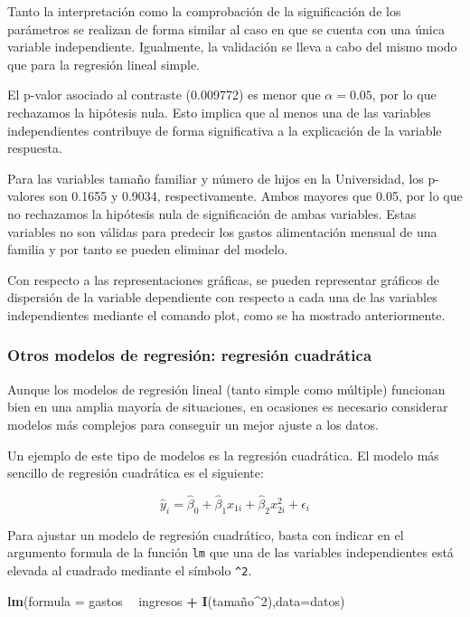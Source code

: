 \documentclass[]{book}
\newenvironment{Shaded}{\begin{snugshade}}{\end{snugshade}}
\newcommand{\KeywordTok}[1]{\textcolor[rgb]{0.13,0.29,0.53}{\textbf{#1}}}
\newcommand{\DataTypeTok}[1]{\textcolor[rgb]{0.13,0.29,0.53}{#1}}
\newcommand{\DecValTok}[1]{\textcolor[rgb]{0.00,0.00,0.81}{#1}}
\newcommand{\StringTok}[1]{\textcolor[rgb]{0.31,0.60,0.02}{#1}}
\newcommand{\OperatorTok}[1]{\textcolor[rgb]{0.81,0.36,0.00}{\textbf{#1}}}
\newcommand{\NormalTok}[1]{#1}
\begin{document}
Tanto la interpretación como la comprobación de la significación de los
parámetros se realizan de forma similar al caso en que se cuenta con una
única variable independiente. Igualmente, la validación se lleva a cabo
del mismo modo que para la regresión lineal simple.

El p-valor asociado al contraste (0.009772) es menor que
\(\alpha = 0.05\), por lo que rechazamos la hipótesis nula. Esto implica
que al menos una de las variables independientes contribuye de forma
significativa a la explicación de la variable respuesta.

Para las variables tamaño familiar y número de hijos en la Universidad,
los p-valores son 0.1655 y 0.9034, respectivamente. Ambos mayores que
0.05, por lo que no rechazamos la hipótesis nula de significación de
ambas variables. Estas variables no son válidas para predecir los gastos
alimentación mensual de una familia y por tanto se pueden eliminar del
modelo.

Con respecto a las representaciones gráficas, se pueden representar
gráficos de dispersión de la variable dependiente con respecto a cada
una de las variables independientes mediante el comando plot, como se ha
mostrado anteriormente.

\subsubsection{Otros modelos de regresión: regresión
cuadrática}\label{otros-modelos-de-regresion-regresion-cuadratica}

Aunque los modelos de regresión lineal (tanto simple como múltiple)
funcionan bien en una amplia mayoría de situaciones, en ocasiones es
necesario considerar modelos más complejos para conseguir un mejor
ajuste a los datos.

Un ejemplo de este tipo de modelos es la regresión cuadrática. El modelo
más sencillo de regresión cuadrática es el siguiente:

\[
    \hat{y}_i  = \hat{\beta}_0 + \hat{\beta}_1 x_{1i} + \hat{\beta}_2 x_{2i}^2  + \epsilon_{i} 
\]

Para ajustar un modelo de regresión cuadrático, basta con indicar en el
argumento formula de la función \texttt{lm} que una de las variables
independientes está elevada al cuadrado mediante el símbolo
\texttt{\^{}2}.

\begin{Shaded}
\begin{Highlighting}[]
\KeywordTok{lm}\NormalTok{(}\DataTypeTok{formula =}\NormalTok{ gastos }\OperatorTok{~}\StringTok{ }\NormalTok{ingresos }\OperatorTok{+}\StringTok{ }\KeywordTok{I}\NormalTok{(tamaño}\OperatorTok{^}\DecValTok{2}\NormalTok{),}\DataTypeTok{data=}\NormalTok{datos)}
\end{Highlighting}
\end{Shaded}
\end{document}
